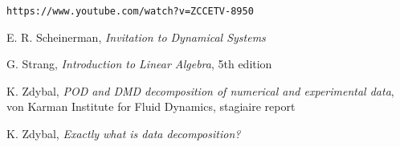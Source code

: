 \documentclass[10pt,twocolumn]{article}
\begin{document}
 \verb|https://www.youtube.com/watch?v=ZCCETV-8950| \label{bib:andymation}

 E. R. Scheinerman, \textit{Invitation to Dynamical Systems}

 G. Strang, \textit{Introduction to Linear Algebra}, 5th edition

 K. Zdybal, \textit{POD and DMD decomposition of numerical and experimental data}, von Karman Institute for Fluid Dynamics, stagiaire report 

 K. Zdybal, \textit{Exactly what is data decomposition?}
\end{document}
